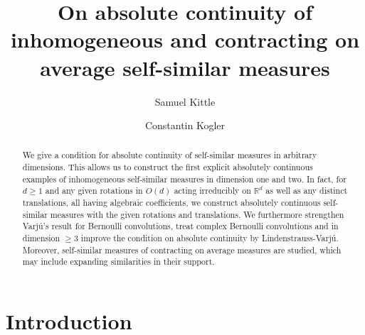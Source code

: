 \documentclass[10pt, english,oneside,reqno]{amsart}
\theoremstyle{plain}
\theoremstyle{remark}
\numberwithin{equation}{section}
\numberwithin{figure}{section}
\newcommand{\R}{\mathbb{R}}
\begin{document}
	\title[Absolutely continuous self-similar measures]{On absolute continuity of inhomogeneous and contracting on average self-similar measures}
	\author[sk]{Samuel Kittle}
    \author[ck]{Constantin Kogler}

    \begin{abstract}
        We give a condition for absolute continuity of self-similar measures in arbitrary dimensions. This allows us to construct the first explicit absolutely continuous examples of inhomogeneous self-similar measures in dimension one and two. In fact, for $d\geq 1$ and any given rotations in $O(d)$ acting irreducibly on $\R^d$ as well as any distinct translations, all having algebraic coefficients, we construct absolutely continuous self-similar measures with the given rotations and translations. We furthermore strengthen Varjú's result for Bernoulli convolutions, treat complex Bernoulli convolutions and in dimension $\geq 3$ improve the condition on absolute continuity by Lindenstrauss-Varjú. Moreover, self-similar measures of contracting on average measures are studied, which may include expanding similarities in their support.
    \end{abstract}


    \address{Samuel Kittle, Department of Mathematics, University College London, 25 Gordon Street, London WC1H 0AY, United Kingdom}

    \address{Constantin Kogler, Institute for Advanced Study, 1 Einstein Dr, Princeton, NJ 08540, United States of America}

    \maketitle

    \tableofcontents
	
    \section{Introduction}
\end{document}
